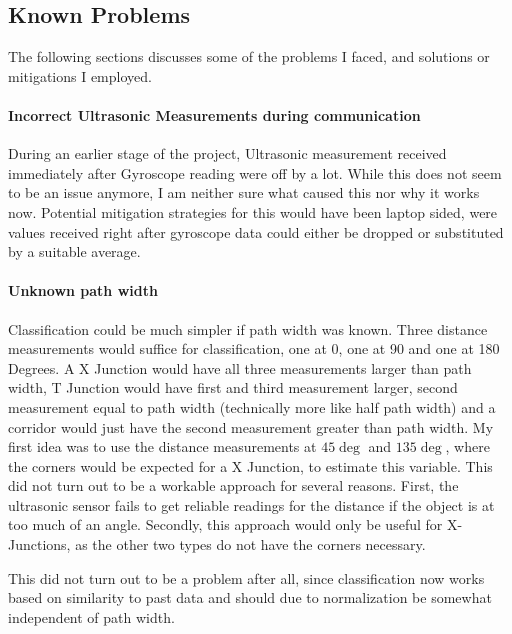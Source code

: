 \subsection{Known Problems}

The following sections discusses some of the problems I faced, and solutions or mitigations I employed.


\paragraph{Incorrect Ultrasonic Measurements during \IIC communication}
During an earlier stage of the project, Ultrasonic measurement received immediately after Gyroscope reading were off
by a lot.
While this does not seem to be an issue anymore, I am neither sure what caused this nor why it works now.
Potential mitigation strategies for this would have been laptop sided, were values received right after gyroscope data
could either be dropped or substituted by a suitable average.


\paragraph{Unknown path width}
Classification could be much simpler if path width was known. Three distance measurements would suffice for classification, one at 0, one at 90 and one at 180 Degrees.
A X Junction would have all three measurements larger than path width,
T Junction would have first and third measurement larger, second measurement equal to path width (technically more like half path width) and
a corridor would just have the second measurement greater than path width.
My first idea was to use the distance measurements at $45\deg$ and $135\deg$, where the corners would be expected for a X Junction, to estimate this variable.
This did not turn out to be a workable approach for several reasons.
First, the ultrasonic sensor fails to get reliable readings for the distance if the object is at too much of an angle.
Secondly, this approach would only be useful for X-Junctions, as the other two types do not have the corners necessary.

This did not turn out to be a problem after all, since classification now works based on similarity to past data and should due to normalization be somewhat independent of path width.

